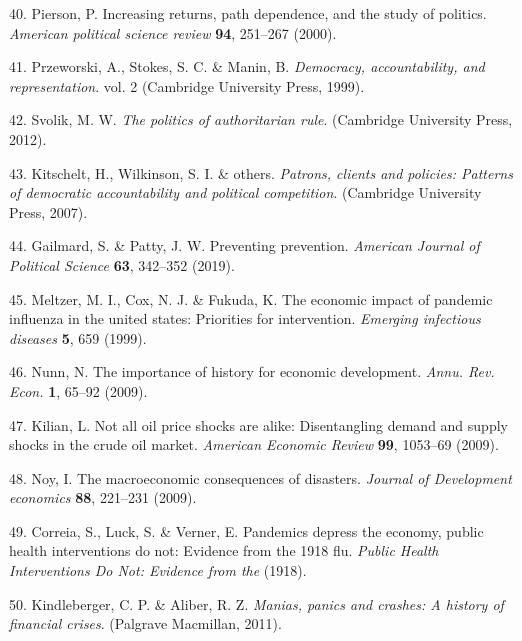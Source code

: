 \documentclass[]{article}
\begin{document}
\begin{cslreferences}
\leavevmode\hypertarget{ref-pierson2000increasing}{}%
40. Pierson, P. Increasing returns, path dependence, and the study of politics. \emph{American political science review} \textbf{94}, 251--267 (2000).

\leavevmode\hypertarget{ref-przeworski1999democracy}{}%
41. Przeworski, A., Stokes, S. C. \& Manin, B. \emph{Democracy, accountability, and representation}. vol. 2 (Cambridge University Press, 1999).

\leavevmode\hypertarget{ref-svolik2012politics}{}%
42. Svolik, M. W. \emph{The politics of authoritarian rule}. (Cambridge University Press, 2012).

\leavevmode\hypertarget{ref-kitschelt2007patrons}{}%
43. Kitschelt, H., Wilkinson, S. I. \& others. \emph{Patrons, clients and policies: Patterns of democratic accountability and political competition}. (Cambridge University Press, 2007).

\leavevmode\hypertarget{ref-gailmard2019preventing}{}%
44. Gailmard, S. \& Patty, J. W. Preventing prevention. \emph{American Journal of Political Science} \textbf{63}, 342--352 (2019).

\leavevmode\hypertarget{ref-meltzer1999economic}{}%
45. Meltzer, M. I., Cox, N. J. \& Fukuda, K. The economic impact of pandemic influenza in the united states: Priorities for intervention. \emph{Emerging infectious diseases} \textbf{5}, 659 (1999).

\leavevmode\hypertarget{ref-nunn2009importance}{}%
46. Nunn, N. The importance of history for economic development. \emph{Annu. Rev. Econ.} \textbf{1}, 65--92 (2009).

\leavevmode\hypertarget{ref-kilian2009not}{}%
47. Kilian, L. Not all oil price shocks are alike: Disentangling demand and supply shocks in the crude oil market. \emph{American Economic Review} \textbf{99}, 1053--69 (2009).

\leavevmode\hypertarget{ref-noy2009macroeconomic}{}%
48. Noy, I. The macroeconomic consequences of disasters. \emph{Journal of Development economics} \textbf{88}, 221--231 (2009).

\leavevmode\hypertarget{ref-correia1918pandemics}{}%
49. Correia, S., Luck, S. \& Verner, E. Pandemics depress the economy, public health interventions do not: Evidence from the 1918 flu. \emph{Public Health Interventions Do Not: Evidence from the} (1918).

\leavevmode\hypertarget{ref-kindleberger2011manias}{}%
50. Kindleberger, C. P. \& Aliber, R. Z. \emph{Manias, panics and crashes: A history of financial crises}. (Palgrave Macmillan, 2011).


\end{cslreferences}
\end{document}
